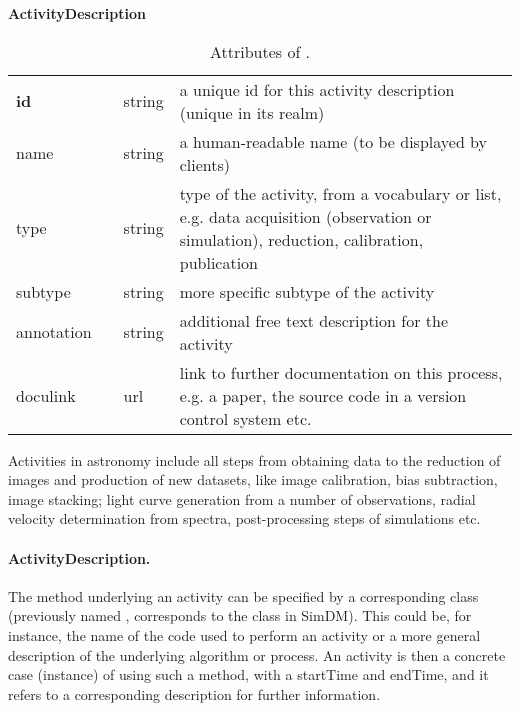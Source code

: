 \begin{table}[ht]
\small
{}\textwidth
\textbf{\normalsize ActivityDescription}\vspace{0.25em}\\
\begin{tabulary}{1.0\textwidth}{@{}p{0cm}p{2.5cm}lL@{}}
\toprule
{} & \head{} &  & \\
\midrule
\textbf{id}  & & string & a unique id for this activity description (unique in its realm)\\
name         & & string & a human-readable name (to be displayed by clients)\\
type         & & string & type of the activity, from a vocabulary or list, e.g. data acquisition (observation or simulation), reduction, calibration, publication\\
subtype      & & string & more specific subtype of the activity\\
annotation  & & string & additional free text description for the activity\\
doculink     & & url    & link to further documentation on this process, e.g. a 
paper, the source code in a version control system etc.\\
\bottomrule
\end{tabulary}
\caption{Attributes of .}
\end{table}


Activities in astronomy include all steps from obtaining data to the reduction of 
images and production of new datasets, like image calibration, bias subtraction, image stacking; 
light curve generation from a number of observations, radial velocity 
determination from spectra, post-processing steps of simulations etc.

\paragraph{ActivityDescription.}
The method underlying an activity can be specified by a corresponding 
 class (previously named , corresponds 
to the  class in SimDM). This could be, 
for instance, the name of the code used to perform an activity or a more general 
description of the underlying algorithm or process. An activity is then a 
concrete case (instance) of using such a method, with a startTime and endTime, 
and it refers to a corresponding description for further information.

